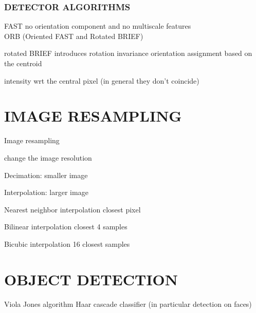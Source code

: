 \documentclass[11pt,english]{article}
\begin{document}
\subsubsection*{DETECTOR ALGORITHMS}
FAST \makebox[0.5cm]{\textrightarrow} no orientation component and no multiscale features \\
ORB (Oriented FAST and Rotated BRIEF) \par
    \makebox[1.5cm]{\textrightarrow} rotated BRIEF introduces rotation invariance \makebox[0.5cm]{\textrightarrow} orientation assignment based on the centroid\par
    \makebox[1.5cm]{\textrightarrow} intensity wrt the central pixel (in general they don't coincide)\par

\section{IMAGE RESAMPLING}

Image resampling \par
    \makebox[1.5cm]{\textrightarrow}  change the image resolution\par
    \makebox[1.5cm]{\textrightarrow}  Decimation: smaller image\par
    \makebox[1.5cm]{\textrightarrow}  Interpolation: larger image \par
        \makebox[3.5cm]{-} Nearest neighbor interpolation \makebox[0.5cm]{\textrightarrow} closest pixel\par
        \makebox[3.5cm]{-} Bilinear interpolation \makebox[0.5cm]{\textrightarrow} closest 4 samples\par
        \makebox[3.5cm]{-} Bicubic interpolation	\makebox[0.5cm]{\textrightarrow} 16 closest samples\par

\section{OBJECT DETECTION}

Viola Jones algorithm \makebox[0.5cm]{\textrightarrow} Haar cascade classifier (in particular detection on faces)
\end{document}
